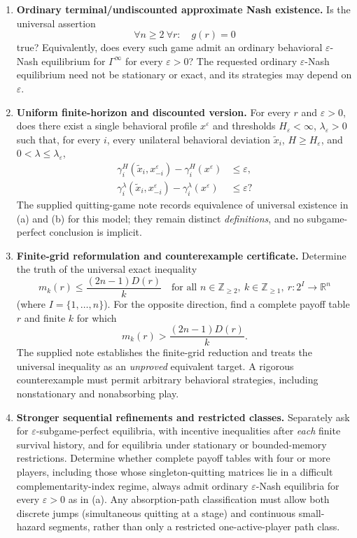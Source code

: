\documentclass[11pt,a4paper]{article}
\newcommand{\R}{\mathbb R}
\begin{document}
\begin{enumerate}[label=\textbf{(\alph*)},leftmargin=2.5em]
	\item \textbf{Ordinary terminal/undiscounted approximate Nash existence.}
	Is the universal assertion
	\[
	\boxed{\quad \forall n\ge2\ \forall r:\quad
		g(r)=0\quad}
	\]
	true? Equivalently, does every such game admit an ordinary behavioral
	$\varepsilon$-Nash equilibrium for $\Gamma^\infty$ for every
	$\varepsilon>0$? The requested ordinary $\varepsilon$-Nash equilibrium
	need not be stationary or exact, and its strategies may depend on
	$\varepsilon$.
	
	\item \textbf{Uniform finite-horizon and discounted version.}
	For every $r$ and $\varepsilon>0$, does there exist a single
	behavioral profile $x^\varepsilon$ and thresholds
	$H_\varepsilon<\infty$, $\lambda_\varepsilon>0$ such that, for every
	$i$, every unilateral behavioral deviation $\widetilde x_i$,
	$H\ge H_\varepsilon$, and $0<\lambda\le\lambda_\varepsilon$,
	\[
	\begin{aligned}
		\gamma_i^H(\widetilde x_i,x_{-i}^\varepsilon)
		-\gamma_i^H(x^\varepsilon)&\le\varepsilon,\\
		\gamma_i^\lambda(\widetilde x_i,x_{-i}^\varepsilon)
		-\gamma_i^\lambda(x^\varepsilon)&\le\varepsilon?
	\end{aligned}
	\]
	The supplied quitting-game note records equivalence of universal
	existence in (a) and (b) for this model; they remain distinct
	\emph{definitions}, and no subgame-perfect conclusion is implicit.
	
	\item \textbf{Finite-grid reformulation and counterexample certificate.}
	Determine the truth of the universal exact inequality
	\[
	\boxed{\quad
		m_k(r)\le\frac{(2n-1)D(r)}{k}
		\quad\text{for all }n\in\mathbb Z_{\ge2},\ k\in\mathbb Z_{\ge1},\ r:2^I\to\R^n\quad}
	\]
	(where $I=\{1,\ldots,n\}$). For the opposite direction, find a
	complete payoff table $r$ and finite $k$ for which
	\[
	m_k(r)>\frac{(2n-1)D(r)}{k}.
	\]
	The supplied note establishes the finite-grid reduction and treats
	the universal inequality as an \emph{unproved} equivalent target.
	A rigorous counterexample must permit arbitrary behavioral
	strategies, including nonstationary and nonabsorbing play.
	
	\item \textbf{Stronger sequential refinements and restricted classes.}
	Separately ask for $\varepsilon$-subgame-perfect equilibria, with
	incentive inequalities after \emph{each} finite survival history,
	and for equilibria under stationary or bounded-memory restrictions.
	Determine whether complete payoff tables with four or more players,
	including those whose singleton-quitting matrices lie in a difficult
	complementarity-index regime, always admit ordinary
	$\varepsilon$-Nash equilibria for every $\varepsilon>0$ as in (a).
	Any absorption-path classification must allow both discrete jumps
	(simultaneous quitting at a stage) and continuous small-hazard
	segments, rather than only a restricted one-active-player path class.
\end{enumerate}
\end{document}
